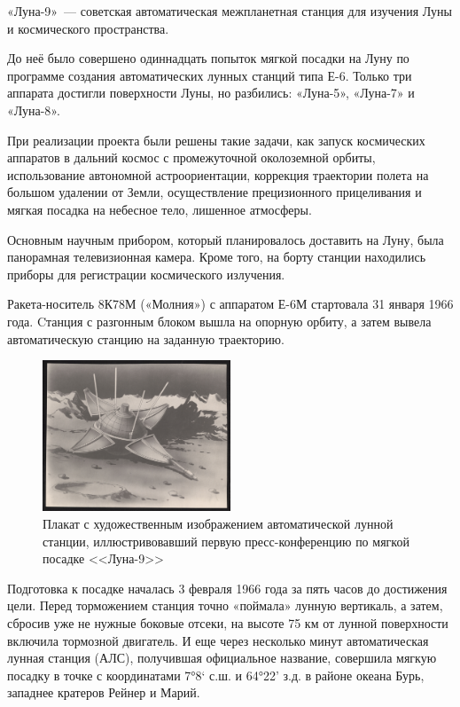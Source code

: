 \noindent «Луна-9» — советская автоматическая межпланетная станция для изучения Луны и космического пространства. 

\noindent До неё было совершено одиннадцать попыток мягкой посадки на Луну по программе создания автоматических лунных станций типа Е-6. Только три аппарата достигли поверхности Луны, но разбились: «Луна-5», «Луна-7» и «Луна-8».

\noindent При реализации проекта были решены такие задачи, как запуск космических аппаратов в дальний космос с промежуточной околоземной орбиты, использование автономной астроориентации, коррекция траектории полета на большом удалении от Земли, осуществление прецизионного прицеливания и мягкая посадка на небесное тело, лишенное атмосферы.

\noindent Основным научным прибором, который планировалось доставить на Луну, была панорамная телевизионная камера. Кроме того, на борту станции находились приборы для регистрации космического излучения.

\noindent Ракета-носитель 8К78М («Молния») с аппаратом Е-6М стартовала 31 января 1966 года. Cтанция с разгонным блоком вышла на опорную орбиту, а затем вывела автоматическую станцию на заданную траекторию.
\begin{figure}
	\includegraphics[width=0.5\textwidth]{4164397702}
	\caption{Плакат с художественным изображением автоматической лунной станции, иллюстривовавший первую пресс-конференцию по мягкой посадке <<Луна-9>>}
\end{figure}
\noindent Подготовка к посадке началась 3 февраля 1966 года за пять часов до достижения цели. Перед торможением станция точно «поймала» лунную вертикаль, а затем, сбросив уже не нужные боковые отсеки, на высоте 75 км от лунной поверхности включила тормозной двигатель. И еще через несколько минут автоматическая лунная станция (АЛС), получившая официальное название, совершила мягкую посадку в точке с координатами 7°8‘ с.ш. и 64°22’ з.д. в районе океана Бурь, западнее кратеров Рейнер и Марий.
